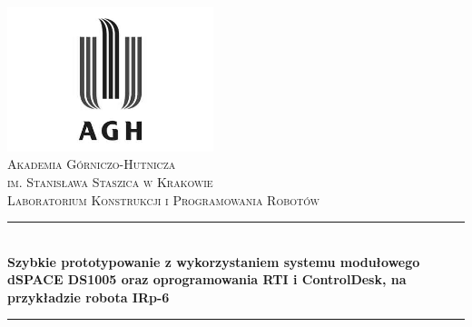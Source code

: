 \begin{titlepage}

\newcommand{\HRule}{\rule{\linewidth}{0.5mm}}

\center
 

\includegraphics[width=6cm]{../res/img/logo.png}\\[1cm]
 
 

\textsc{\LARGE Akademia Górniczo-Hutnicza \\[0.2cm]
im. Stanisława Staszica w Krakowie}\\[1.5cm]

\textsc{\Large Laboratorium Konstrukcji i Programowania Robotów}\\[0.5cm]


\HRule \\[0.5cm]
{ \large \bfseries Szybkie prototypowanie z wykorzystaniem systemu modułowego 
dSPACE DS1005 oraz oprogramowania RTI i ControlDesk, na przykładzie
robota IRp-6}\\[0.3cm]
\HRule \\[1.5cm]


\end{titlepage}
